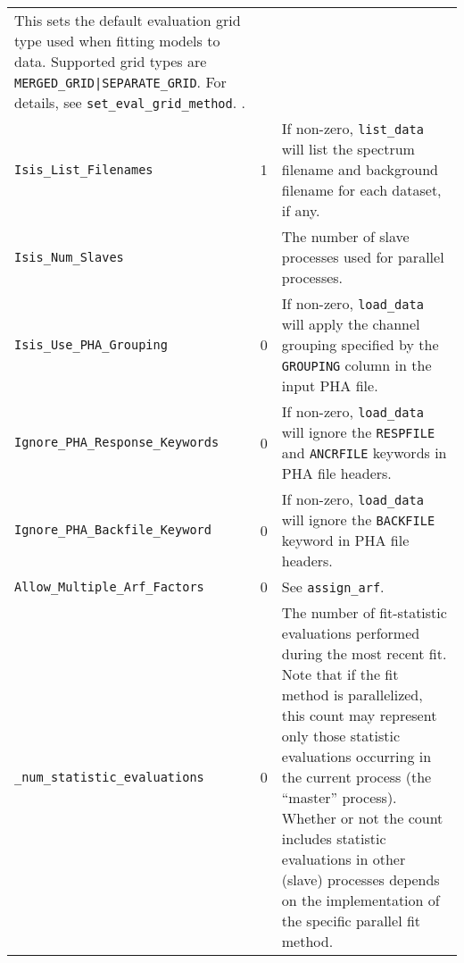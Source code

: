 \documentclass{book}
\begin{document}
{\begin{center}
\begin{tabular}{|l|c|p{3.2in}|}
This sets the default evaluation grid type used when fitting
models to data. Supported grid types are {\tt MERGED\_GRID|SEPARATE\_GRID}.
For details, see {\tt set\_eval\_grid\_method}.
\index{{\tt Isis\_Eval\_Grid\_Method}}.\\
{\tt Isis\_List\_Filenames} & 1 & If non-zero, \verb|list_data| will
list the spectrum filename and background filename for each
dataset, if any.\index{{\tt Isis\_List\_Filenames}}\\
{\tt Isis\_Num\_Slaves} &  & The number of slave processes used
for parallel processes.\index{{\tt Isis\_Num\_Slaves}}\\
{\tt Isis\_Use\_PHA\_Grouping} & 0 & If non-zero,
\verb|load_data| will apply the channel grouping specified by the
\verb|GROUPING| column in the input PHA file.
\index{{\tt Isis\_Use\_PHA\_Grouping}}\\
{\tt Ignore\_PHA\_Response\_Keywords} & 0 & If non-zero,
\verb|load_data| will ignore the \verb|RESPFILE| and
\verb|ANCRFILE| keywords in PHA file headers.
\index{{\tt Ignore\_PHA\_Response\_Keywords}}\\
{\tt Ignore\_PHA\_Backfile\_Keyword} & 0 & If non-zero,
\verb|load_data| will ignore the \verb|BACKFILE|
keyword in PHA file headers.
\index{{\tt Ignore\_PHA\_Backfile\_Keywords}}\\
{\tt Allow\_Multiple\_Arf\_Factors} & 0 & See \verb|assign_arf|.
\index{{\tt Allow\_Multiple\_Arf\_Factors}} \\
{\tt \_num\_statistic\_evaluations} & 0 & The number of
fit-statistic evaluations performed
during the most recent fit.  Note that if the fit method is
parallelized, this count may represent only those statistic evaluations
occurring in the current process (the ``master'' process).  Whether or not
the count includes statistic evaluations in other (slave) processes
depends on the implementation of the specific parallel fit
method. \index{{\tt \_num\_statistic\_evaluations}} \\
\hline
\end{tabular}
\vfill


\end{center}}
\end{document}
